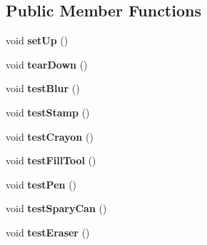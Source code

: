 \subsection*{Public Member Functions}
\begin{DoxyCompactItemize}
\item 
\hypertarget{classInteractiveToolTest_a1785f49c82dc8a6a9de2ee722938090e}{void {\bfseries set\-Up} ()}\label{classInteractiveToolTest_a1785f49c82dc8a6a9de2ee722938090e}

\item 
\hypertarget{classInteractiveToolTest_a5ae8624b8d00755c6bb42e7a98302251}{void {\bfseries tear\-Down} ()}\label{classInteractiveToolTest_a5ae8624b8d00755c6bb42e7a98302251}

\item 
\hypertarget{classInteractiveToolTest_a0b14cd48ec4ef6fc0c6f0615de04c7f4}{void {\bfseries test\-Blur} ()}\label{classInteractiveToolTest_a0b14cd48ec4ef6fc0c6f0615de04c7f4}

\item 
\hypertarget{classInteractiveToolTest_ae19ed1fb8f301414acc21bf3d6fd8e00}{void {\bfseries test\-Stamp} ()}\label{classInteractiveToolTest_ae19ed1fb8f301414acc21bf3d6fd8e00}

\item 
\hypertarget{classInteractiveToolTest_a61352fd2841db677f945622377ad3305}{void {\bfseries test\-Crayon} ()}\label{classInteractiveToolTest_a61352fd2841db677f945622377ad3305}

\item 
\hypertarget{classInteractiveToolTest_a2da80ea576985e3519eccf94775a748f}{void {\bfseries test\-Fill\-Tool} ()}\label{classInteractiveToolTest_a2da80ea576985e3519eccf94775a748f}

\item 
\hypertarget{classInteractiveToolTest_a6086555b4e770c47951fbf31ccf66f64}{void {\bfseries test\-Pen} ()}\label{classInteractiveToolTest_a6086555b4e770c47951fbf31ccf66f64}

\item 
\hypertarget{classInteractiveToolTest_aeb2b7aca1a31e44691ba1a9cb08b5f5a}{void {\bfseries test\-Spary\-Can} ()}\label{classInteractiveToolTest_aeb2b7aca1a31e44691ba1a9cb08b5f5a}

\item 
\hypertarget{classInteractiveToolTest_a7113ba68c06dd240dd6fc5c23f158150}{void {\bfseries test\-Eraser} ()}\label{classInteractiveToolTest_a7113ba68c06dd240dd6fc5c23f158150}


\end{DoxyCompactItemize}
